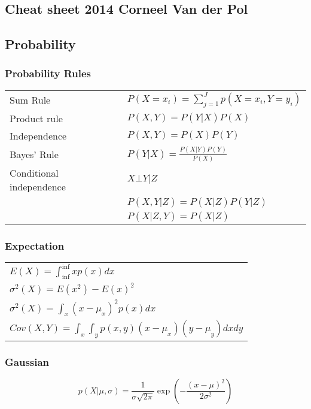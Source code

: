 \documentclass[main]{subfiles}
\begin{document}
\begin{landscape}
\ifx\cheatsheet\undefined
{}
\else
{\color{sectionColor}\section{Cheat sheet 2014 Corneel Van der Pol}} %
\fi
%
%
\begin{multicols}{4}
\scriptsize
{\color{subsectionColor}\subsection{Probability}}
{\color{subsubsectionColor}\subsubsection{Probability Rules}}
\begin{tabular}{p{5em}l}
Sum Rule& \(P(X=x_i) = \sum_{j=1}^{J} p(X=x_i,Y=y_i)\)\\
Product rule& \(P(X, Y) = P(Y|X) P(X)\) \\
Independence& \(P(X, Y) = P(X)P(Y)\) \\
Bayes' Rule& \(P(Y|X) = \frac{P(X|Y)P(Y)}{P(X)}\) \\
Conditional independence& \(X\bot Y|Z \)\\
 & \(P(X,Y|Z) = P(X|Z)P(Y|Z)\) \\
 & \(P(X|Z,Y) = P(X|Z)\)
\end{tabular}
{\color{subsubsectionColor}\subsubsection{Expectation}}
\begin{tabular}{l}
\(E(X) = \int_{\inf}^{\inf} x p(x) dx\) \\
\(\sigma^2(X) = E(x^2)-{E(x)}^2\) \\
\(\sigma^2(X) = \int_x (x-\mu_x)^2 p(x) dx\) \\
\(Cov(X, Y) = \int_x \int_y p(x,y) (x-\mu_x)(y-\mu_y) dx dy\)
\end{tabular}

{\color{subsubsectionColor}\subsubsection{Gaussian}}
\begin{equation}
p(X|\mu,\sigma)=\frac{1}{\sigma \sqrt{2\pi}} \exp(-\frac{(x-\mu)^2}{2\sigma^2})
\end{equation}


\end{multicols}
\end{landscape}
\end{document}
